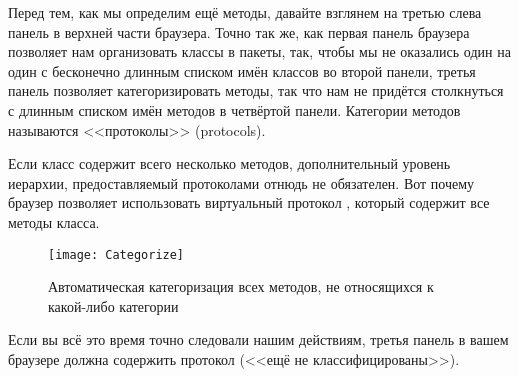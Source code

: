 \documentclass[a4paper,10pt,twoside]{book}
\begin{document}
{%
Перед тем, как мы определим ещё методы, давайте взглянем на третью слева панель в верхней части браузера.
Точно так же, как первая панель браузера позволяет нам организовать классы в пакеты, так, чтобы мы не оказались один на один с бесконечно длинным списком имён классов во второй панели, третья панель позволяет категоризировать методы, так что нам не придётся столкнуться с длинным списком имён методов в четвёртой панели.
Категории методов называются <<протоколы>> (protocols).

Если класс содержит всего несколько методов, дополнительный уровень иерархии, предоставляемый протоколами отнюдь не обязателен.
Вот почему браузер позволяет использовать виртуальный протокол , который содержит все методы класса.

\begin{figure}[htbp]
   \centering
   \texttt{[image: Categorize]} 
   \caption{Автоматическая категоризация всех методов, не относящихся к какой-либо категории}
\end{figure}

Если вы всё это время точно следовали нашим действиям, третья панель в вашем браузере должна содержить протокол  (<<ещё не классифицированы>>).

}
\end{document}
